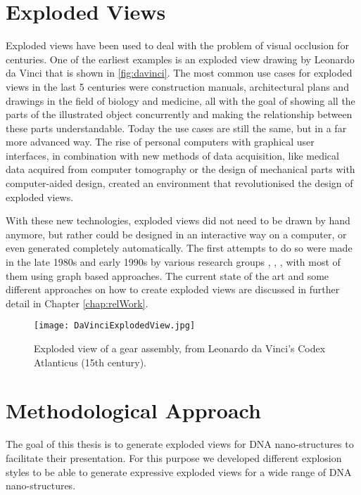 \documentclass[draft,final]{vutinfth} %
\begin{document}
\section{Exploded Views}
\label{sec: explV}

Exploded views have been used to deal with the problem of visual occlusion for centuries. One of the earliest examples is an exploded view drawing by Leonardo da Vinci that is shown in \autoref{fig:davinci}. The most common use cases for exploded views in the last 5 centuries were construction manuals, architectural plans and drawings in the field of biology and medicine, all with the goal of showing all the parts of the illustrated object concurrently and making the relationship between these parts understandable. Today the use cases are still the same, but in a far more advanced way. The rise of personal computers with graphical user interfaces, in combination with new methods of data acquisition, like medical data acquired from computer tomography or the design of mechanical parts with computer-aided design, created an environment that revolutionised the design of exploded views.
\par With these new technologies, exploded views did not need to be drawn by hand anymore, but rather could be designed in an interactive way on a computer, or even generated completely automatically. The first attempts to do so were made in the late 1980s and early 1990s by various research groups \cite{de1987simplified}, \cite{kroll1989rule}, \cite{mohammad1993automatic}, with most of them using graph based approaches. The current state of the art and some different approaches on how to create exploded views are discussed in further detail in Chapter \ref{chap:relWork}.

\begin{figure}
\centering
\texttt{[image: DaVinciExplodedView.jpg]}
\caption{Exploded view of a gear assembly, from Leonardo da Vinci’s Codex Atlanticus (15th century).}
\label{fig:davinci}
\end{figure}

\section{Methodological Approach}
\label{sec:methodApp}
The goal of this thesis is to generate exploded views for DNA nano-structures to facilitate their presentation. For this purpose we developed different explosion styles to be able to generate expressive exploded views for a wide range of DNA nano-structures.
\end{document}

